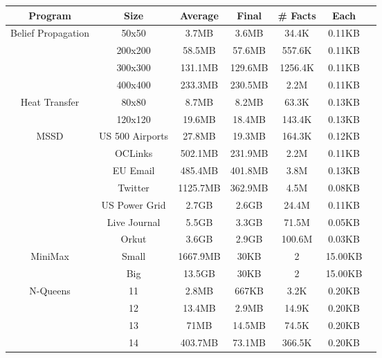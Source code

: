 \begin{tabular}{c | c || c | c | c || c c} \hline
	\textbf{Program} & \textbf{Size} & \textbf{Average} & \textbf{Final} & \textbf{\# Facts} & \textbf{Each} \\ \hline \hline
	\multirow{4}{*}{Belief Propagation}  & 50x50 & 3.7MB & 3.6MB & 34.4K & 0.11KB \\
		 & 200x200 & 58.5MB & 57.6MB & 557.6K & 0.11KB \\
		 & 300x300 & 131.1MB & 129.6MB & 1256.4K & 0.11KB \\
		 & 400x400 & 233.3MB & 230.5MB & 2.2M & 0.11KB \\
	\hline
	\multirow{2}{*}{Heat Transfer}  & 80x80 & 8.7MB & 8.2MB & 63.3K & 0.13KB \\
		 & 120x120 & 19.6MB & 18.4MB & 143.4K & 0.13KB \\
	\hline
	\multirow{7}{*}{MSSD}  & US 500 Airports & 27.8MB & 19.3MB & 164.3K & 0.12KB \\
		 & OCLinks & 502.1MB & 231.9MB & 2.2M & 0.11KB \\
		 & EU Email & 485.4MB & 401.8MB & 3.8M & 0.13KB \\
		 & Twitter & 1125.7MB & 362.9MB & 4.5M & 0.08KB \\
		 & US Power Grid & 2.7GB & 2.6GB & 24.4M & 0.11KB \\
		 & Live Journal & 5.5GB & 3.3GB & 71.5M & 0.05KB \\
		 & Orkut & 3.6GB & 2.9GB & 100.6M & 0.03KB \\
	\hline
	\multirow{2}{*}{MiniMax}  & Small & 1667.9MB & 30KB & 2 & 15.00KB \\
		 & Big & 13.5GB & 30KB & 2 & 15.00KB \\
	\hline
	\multirow{4}{*}{N-Queens}  & 11 & 2.8MB & 667KB & 3.2K & 0.20KB \\
		 & 12 & 13.4MB & 2.9MB & 14.9K & 0.20KB \\
		 & 13 & 71MB & 14.5MB & 74.5K & 0.20KB \\
		 & 14 & 403.7MB & 73.1MB & 366.5K & 0.20KB \\
	\hline
\end{tabular}
